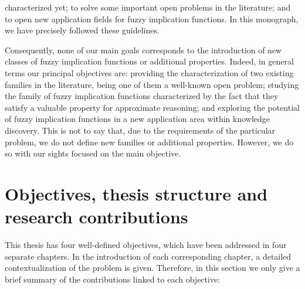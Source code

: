 \noindent characterized yet; to solve some important open problems in the literature; and to open new application fields for fuzzy implication functions. In this monograph, we have precisely followed these guidelines.

Consequently, none of our main goals corresponds to the introduction of new classes of fuzzy implication functions or additional properties. Indeed, in general terms our principal objectives are: providing the characterization of two existing families in the literature, being one of them a well-known open problem; studying the family of fuzzy implication functions characterized by the fact that they satisfy a valuable property for approximate reasoning; and exploring the potential of fuzzy implication functions in a new application area within knowledge discovery. This is not to say that, due to the requirements of the particular problem, we do not define new families or additional properties. However, we do so with our sights focused on the main objective.

\section{Objectives, thesis structure and research contributions}

This thesis has four well-defined objectives, which have been addressed in four separate chapters. In the introduction of each corresponding chapter, a detailed contextualization of the problem is given. Therefore, in this section we only give a brief summary of the contributions linked to each objective:


